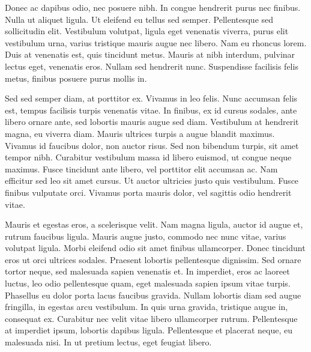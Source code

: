 Donec ac dapibus odio, nec posuere nibh. In congue hendrerit purus nec finibus. Nulla ut aliquet ligula. Ut eleifend eu tellus sed semper. Pellentesque sed sollicitudin elit. Vestibulum volutpat, ligula eget venenatis viverra, purus elit vestibulum urna, varius tristique mauris augue nec libero. Nam eu rhoncus lorem. Duis at venenatis est, quis tincidunt metus. Mauris at nibh interdum, pulvinar lectus eget, venenatis eros. Nullam sed hendrerit nunc. Suspendisse facilisis felis metus, finibus posuere purus mollis in.

Sed sed semper diam, at porttitor ex. Vivamus in leo felis. Nunc accumsan felis est, tempus facilisis turpis venenatis vitae. In finibus, ex id cursus sodales, ante libero ornare ante, sed lobortis mauris augue sed diam. Vestibulum at hendrerit magna, eu viverra diam. Mauris ultrices turpis a augue blandit maximus. Vivamus id faucibus dolor, non auctor risus. Sed non bibendum turpis, sit amet tempor nibh. Curabitur vestibulum massa id libero euismod, ut congue neque maximus. Fusce tincidunt ante libero, vel porttitor elit accumsan ac. Nam efficitur sed leo sit amet cursus. Ut auctor ultricies justo quis vestibulum. Fusce finibus vulputate orci. Vivamus porta mauris dolor, vel sagittis odio hendrerit vitae.

Mauris et egestas eros, a scelerisque velit. Nam magna ligula, auctor id augue et, rutrum faucibus ligula. Mauris augue justo, commodo nec nunc vitae, varius volutpat ligula. Morbi eleifend odio sit amet finibus ullamcorper. Donec tincidunt eros ut orci ultrices sodales. Praesent lobortis pellentesque dignissim. Sed ornare tortor neque, sed malesuada sapien venenatis et. In imperdiet, eros ac laoreet luctus, leo odio pellentesque quam, eget malesuada sapien ipsum vitae turpis. Phasellus eu dolor porta lacus faucibus gravida. Nullam lobortis diam sed augue fringilla, in egestas arcu vestibulum. In quis urna gravida, tristique augue in, consequat ex. Curabitur nec velit vitae libero ullamcorper rutrum. Pellentesque at imperdiet ipsum, lobortis dapibus ligula. Pellentesque et placerat neque, eu malesuada nisi. In ut pretium lectus, eget feugiat libero.
